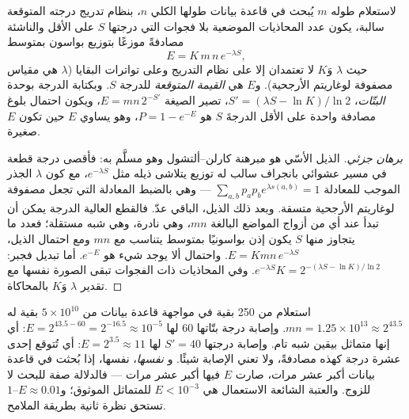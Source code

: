 \begin{theorem}\label{thm:b3:bioinformatics:evalue}
لاستعلام طوله $m$ يُبحث في قاعدة بيانات طولها الكلي
$n$، بنظام تدريج درجته المتوقعة سالبة، يكون عدد
المحاذيات الموضعية بلا فجوات التي درجتها $S$ على الأقل والناشئة مصادفةً
موزعًا بتوزيع بواسون بمتوسط
\[
E = K\,m\,n\,e^{-\lambda S},
\]
حيث $\lambda$ وَ$K$ لا تعتمدان إلا على نظام التدريج وعلى
تواترات البقايا ($\lambda$ هي مقياس مصفوفة لوغاريتم الأرجحية).
و$E$ هي \emph{القيمة المتوقعة} للدرجة $S$. وبكتابة الدرجة
بوحدة \emph{البتّات}، $S' = (\lambda S - \ln K)/\ln 2$، تصير الصيغة
$E = m n\, 2^{-S'}$، ويكون احتمال بلوغ  مصادفة واحدة
على الأقل الدرجةَ $S$ هو $P = 1 - e^{-E}$، وهو يساوي $E$ حين تكون $E$
صغيرة.
\end{theorem}
\begin{proof}[برهان جزئي]
الذيل الأسّي هو مبرهنة كارلن--ألتشول وهو مسلَّم به:
فأقصى درجة قطعة في مسير عشوائي بانجراف سالب له
توزيع يتلاشى ذيله مثل $e^{-\lambda S}$، مع كون $\lambda$
الجذر الموجب للمعادلة $\sum_{a,b} p_{a} p_{b} e^{\lambda s(a,b)} = 1$ ---
وهي بالضبط المعادلة التي تجعل مصفوفة لوغاريتم الأرجحية متسقة.
وبعد ذلك الذيل، الباقي عدّ. فالقطع العالية الدرجة يمكن أن تبدأ
عند أي من أزواج المواضع البالغة $mn$، وهي نادرة، وهي
شبه مستقلة؛ فعدد ما يتجاوز منها $S$ يكون إذن
بواسونيًا بمتوسط يتناسب مع $mn$ ومع احتمال الذيل،
$E = Kmn\,e^{-\lambda S}$. واحتمال ألا يوجد شيء هو $e^{-E}$. أما
تبديل  فجبر: $e^{-\lambda S} K = 2^{-(\lambda S -
\ln K)/\ln 2}$. وفي المحاذيات ذات الفجوات تبقى الصورة نفسها مع تقدير
$\lambda$ وَ$K$ بالمحاكاة.
\end{proof}

\begin{example}\label{ex:b3:bioinformatics:evalue}
استعلام من \num{250} بقية في مواجهة قاعدة بيانات من $5\times 10^{10}$
بقية له $mn = 1.25\times 10^{13} \approx 2^{43.5}$. وإصابة
درجة بتّاتها $60$ لها $E = 2^{43.5 - 60} = 2^{-16.5} \approx 10^{-5}$:
أي إنها متماثل بيقين شبه تام. وإصابة درجتها $S' = 40$ لها $E = 2^{3.5}
\approx 11$: أي تُتوقع إحدى عشرة درجة كهذه مصادفةً، ولا تعني الإصابة
شيئًا. و\emph{ نفسها}،  نفسها،
إذا بُحثت في قاعدة بيانات أكبر عشر مرات، صارت $E$ فيها أكبر عشر
مرات --- فالدلالة صفة للبحث لا للزوج.
والعتبة الشائعة الاستعمال هي $E < 10^{-3}$ للمتماثل الموثوق؛
و$E \approx 0.01$--$1$ تستحق نظرة ثانية بطريقة الملامح.
\end{example}

